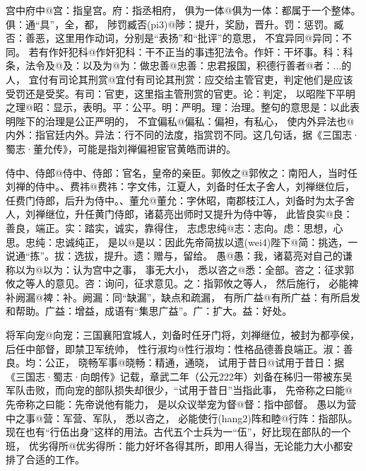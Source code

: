 \documentclass[a4paper]{article}
\newcommand{\comment}[1]{{\noindent\kaiti\large #1}}
\begin{document}

宫中府中@{宫：指皇宫。府：指丞相府}，
俱为一体@{俱为一体：都属于一个整体。俱：通“具”，全，都}，
陟罚臧否(pi3)@{陟：提升，奖励，晋升。罚：惩罚。臧否：善恶，这里用作动词，分别是“表扬”和“批评”的意思}，
不宜异同@{异同：不同}。
若有作奸犯科@{作奸犯科：干不正当的事违犯法令。作奸：干坏事。科：科条，法令}及@{及：以及}为@{为：做}忠善@{忠善：忠君报国，积德行善}者@{者：...的人}，
宜付有司论其刑赏@{宜付有司论其刑赏：应交给主管官吏，判定他们是应该受罚还是受奖。有司：官吏，这里指主管刑赏的官吏。论：判定}，
以昭陛下平明之理@{昭：显示，表明。平：公平。明：严明。理：治理。整句的意思是：以此表明陛下的治理是公正严明的}，
不宜偏私@{偏私：偏袒，有私心}，
使内外异法也@{内外：指官廷内外。异法：行不同的法度，指赏罚不同。这几句话，据《三国志·蜀志·董允传》，可能是指刘禅偏袒宦官黄皓而讲的}。


侍中、侍郎@{侍中、侍郎：官名，皇帝的亲臣。}郭攸之@{郭攸之：南阳人，当时任刘禅的侍中。}、费祎@{费祎：字文伟，江夏人，刘备时任太子舍人，刘禅继位后，任费门侍郎，后升为侍中。}、董允@{董允：字休昭，南郡枝江人，刘备时为太子舍人，刘禅继位，升任黄门侍郎，诸葛亮出师时又提升为侍中}等，
此皆良实@{良：善良，端正。实：踏实，诚实，靠得住}，
志虑忠纯@{志：志向。虑：思想，心思。忠纯：忠诚纯正}，
是以@{是以：因此}先帝简拔以遗(wei4)陛下@{简：挑选，一说通“拣”。拔：选拔，提升。遗：赠与，留给}。
愚@{愚：我，诸葛亮对自己的谦称}以为@{以为：认为}宫中之事，
事无大小，
悉以咨之@{悉：全部。咨之：征求郭攸之等人的意见。咨：询问，征求意见。之：指郭攸之等人}，
然后施行，
必能裨补阙漏@{裨：补。阙漏：同“缺漏”，缺点和疏漏}，
有所广益@{有所广益：有所启发和帮助。广益：增益，成语有“集思广益”。广：扩大。益：好处}。

将军向宠@{向宠：三国襄阳宜城人，刘备时任牙门将，刘禅继位，被封为都亭侯，后任中部督，即禁卫军统帅}，
性行淑均@{性行淑均：性格品德善良端正。淑：善良。均：公正}，
晓畅军事@{晓畅：精通，通晓}，
试用于昔日@{试用于昔日：据《三国志·蜀志·向朗传》记载，章武二年（公元222年）刘备在秭归一带被东吴军队击败，而向宠的部队损失却很少，“试用于昔日”当指此事}，
先帝称之曰能@{先帝称之曰能：先帝说他有能力}，
是以众议举宠为督@{督：指中部督}。
愚以为营中之事@{营：军营、军队}，
悉以咨之，
必能使行(hang2)阵和睦@{行阵：指部队。现在也有“行伍出身”这样的用法。古代五个士兵为一“伍”，好比现在部队的一个班}，
优劣得所@{优劣得所：能力好坏各得其所，即用人得当，无论能力大小都安排了合适的工作}。
\end{document}
